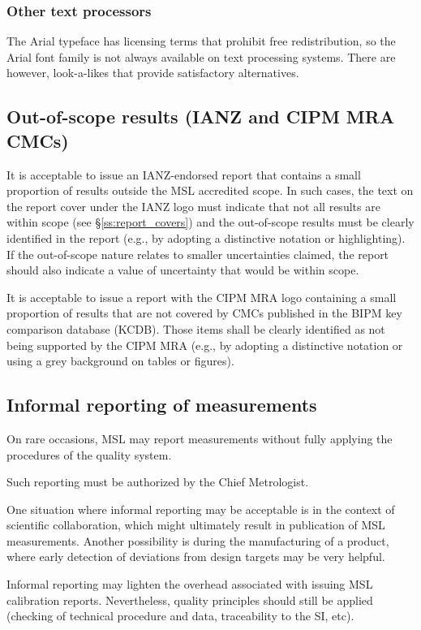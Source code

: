 \subsubsection{Other text processors}
The Arial typeface has licensing terms that prohibit free redistribution, so the Arial font family is not always available on text processing systems. There are however, look-a-likes that provide satisfactory alternatives.

\subsection{Out-of-scope results (IANZ and CIPM MRA CMCs)}
It is acceptable to issue an IANZ-endorsed report that contains a small proportion of results outside the MSL accredited scope. In such cases, the text on the report cover under the IANZ logo must indicate that not all results are within scope (see \S\ref{ss:report_covers}) and the out-of-scope results must be clearly identified in the report (e.g., by adopting a distinctive notation or highlighting). If the out-of-scope nature relates to smaller uncertainties claimed, the report should also indicate a value of uncertainty that would be within scope.

It is acceptable to issue a report with the CIPM MRA logo containing a small proportion of results that are not covered by CMCs published in the BIPM key comparison database (KCDB). Those items shall be clearly identified as not being supported by the CIPM MRA (e.g., by adopting a distinctive notation or using a grey background on tables or figures).

\subsection{Informal reporting of measurements}
 \label{ss:informal_reporting}
On rare occasions, MSL may report measurements without fully applying the procedures of the quality system. 

Such reporting must be authorized by the Chief Metrologist.

One situation where informal reporting may be acceptable is in the context of scientific collaboration, which might ultimately result in publication of MSL measurements. Another possibility is during the manufacturing of a product, where early detection of deviations from design targets may be very helpful.

Informal reporting may lighten the overhead associated with issuing MSL calibration reports. Nevertheless, quality principles should still be applied (checking of technical procedure and data, traceability to the SI, etc).


